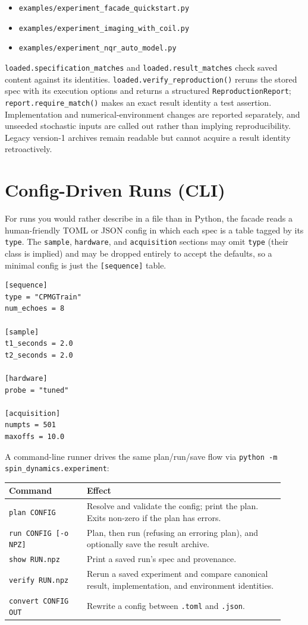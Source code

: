 \documentclass[11pt,oneside]{report}
\newcommand{\code}[1]{\texttt{#1}}
\begin{document}
\begin{itemize}
  \item \code{examples/experiment\_facade\_quickstart.py}
  \item \code{examples/experiment\_imaging\_with\_coil.py}
  \item \code{examples/experiment\_nqr\_auto\_model.py}
\end{itemize}

\code{loaded.specification\_matches} and \code{loaded.result\_matches} check
saved content against its identities. \code{loaded.verify\_reproduction()}
reruns the stored spec with its execution options and returns a structured
\code{ReproductionReport}; \code{report.require\_match()} makes an exact result
identity a test assertion. Implementation and numerical-environment changes
are reported separately, and unseeded stochastic inputs are called out rather
than implying reproducibility. Legacy version-1 archives remain readable but
cannot acquire a result identity retroactively.

\section{Config-Driven Runs (CLI)}

For runs you would rather describe in a file than in Python, the facade reads a
human-friendly TOML or JSON config in which each spec is a table tagged by its
\code{type}. The \code{sample}, \code{hardware}, and \code{acquisition} sections
may omit \code{type} (their class is implied) and may be dropped entirely to
accept the defaults, so a minimal config is just the \code{[sequence]} table.

\begin{lstlisting}[language={}]
[sequence]
type = "CPMGTrain"
num_echoes = 8

[sample]
t1_seconds = 2.0
t2_seconds = 2.0

[hardware]
probe = "tuned"

[acquisition]
numpts = 501
maxoffs = 10.0
\end{lstlisting}

A command-line runner drives the same plan/run/save flow via
\code{python -m spin\_dynamics.experiment}:

\begin{longtable}{p{0.26\linewidth}p{0.66\linewidth}}
\toprule
Command & Effect \\
\midrule
\code{plan CONFIG} & Resolve and validate the config; print the plan. Exits
non-zero if the plan has errors. \\
\code{run CONFIG [-o NPZ]} & Plan, then run (refusing an erroring plan), and
optionally save the result archive. \\
\code{show RUN.npz} & Print a saved run's spec and provenance. \\
\code{verify RUN.npz} & Rerun a saved experiment and compare canonical result,
implementation, and environment identities. \\
\code{convert CONFIG OUT} & Rewrite a config between \code{.toml} and
\code{.json}. \\
\bottomrule
\end{longtable}
\end{document}

